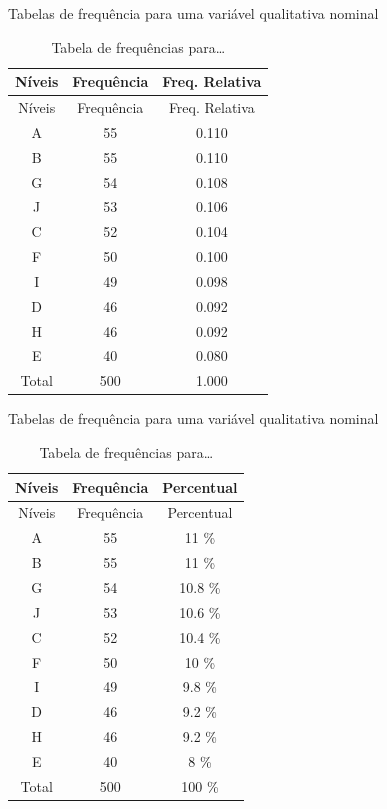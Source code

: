\documentclass[
  ignorenonframetext,
  serif,
  professionalfont,
  usenames,
  dvipsnames,
  aspectratio = 169]{beamer}
\begin{document}
\begin{frame}{Tabelas de frequência para uma variável qualitativa
nominal}
\protect\hypertarget{tabelas-de-frequuxeancia-para-uma-variuxe1vel-qualitativa-nominal-1}{}
\begin{longtable}[]{@{}ccc@{}}
\caption{Tabela de frequências para\ldots{}}\tabularnewline
\toprule()
Níveis & Frequência & Freq. Relativa \\
\midrule()
\endfirsthead
\toprule()
Níveis & Frequência & Freq. Relativa \\
\midrule()
\endhead
A & 55 & 0.110 \\
B & 55 & 0.110 \\
G & 54 & 0.108 \\
J & 53 & 0.106 \\
C & 52 & 0.104 \\
F & 50 & 0.100 \\
I & 49 & 0.098 \\
D & 46 & 0.092 \\
H & 46 & 0.092 \\
E & 40 & 0.080 \\
Total & 500 & 1.000 \\
\bottomrule()
\end{longtable}
\end{frame}

\begin{frame}{Tabelas de frequência para uma variável qualitativa
nominal}
\protect\hypertarget{tabelas-de-frequuxeancia-para-uma-variuxe1vel-qualitativa-nominal-2}{}
\begin{longtable}[]{@{}ccc@{}}
\caption{Tabela de frequências para\ldots{}}\tabularnewline
\toprule()
Níveis & Frequência & Percentual \\
\midrule()
\endfirsthead
\toprule()
Níveis & Frequência & Percentual \\
\midrule()
\endhead
A & 55 & 11 \% \\
B & 55 & 11 \% \\
G & 54 & 10.8 \% \\
J & 53 & 10.6 \% \\
C & 52 & 10.4 \% \\
F & 50 & 10 \% \\
I & 49 & 9.8 \% \\
D & 46 & 9.2 \% \\
H & 46 & 9.2 \% \\
E & 40 & 8 \% \\
Total & 500 & 100 \% \\
\bottomrule()
\end{longtable}
\end{frame}
\end{document}
